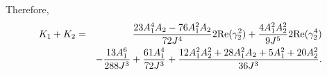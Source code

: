 \documentclass[12pt]{amsart}
\begin{document}
Therefore,
\begin{eqnarray*}
K_1+K_2
&=&{23A_1^4A_2 -76 A_1^2 A_2\over 72 J^4} 2\hbox{Re}(\gamma_2^2)
 +{4 A_1^2 A_2^2 \over 9J^5} 2\hbox{Re}(\gamma_2^4)\\
 &&-{13 A_1^6\over288 J^3} +{61A_1^4\over 72 J^3} +{12 A_1^2A_2^2+28A_1^2A_2+ 5A_1^2+20A_2^2 \over 36 J^3}.
\end{eqnarray*}
\end{document}
